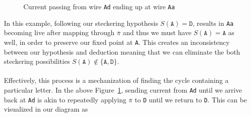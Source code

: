 \begin{figure}[H]
\begin{minipage}{0.45\textwidth}
  \end{minipage}
  \caption{Current passing from wire \texttt{Ad} ending up at wire \texttt{Aa}}
  \label{fig:incorrect_stecker}
\end{figure}
\noindent In this example, following our steckering hypothesis
$S(\texttt{A}) = \texttt{D}$,
results in \texttt{Aa} becoming live after mapping through $\overline\pi$ and
thus we must have $S(\texttt{A}) = \texttt{A}$ as well, in order to
preserve our fixed point at \texttt{A}.
This creates an inconsistency between our hypothesis and deduction
meaning that we can eliminate the both
steckering possibilities $S(\texttt{A}) \notin \{\texttt{A},
\texttt{D}\}$.
\\\\Effectively, this process is a mechanization of
finding the cycle containing a particular letter. In the above
Figure~\ref{fig:incorrect_stecker}, sending current from \texttt{Ad}
until we arrive back at \texttt{Ad} is
akin to repeatedly applying $\overline\pi$ to \texttt{D}
until we return to \texttt{D}. This can be visualized in our diagram as

